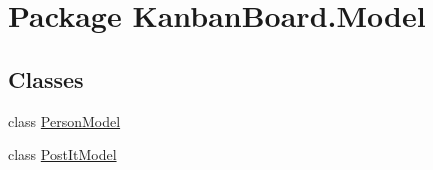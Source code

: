 \hypertarget{namespace_kanban_board_1_1_model}{}\section{Package Kanban\+Board.\+Model}
\label{namespace_kanban_board_1_1_model}
\subsection*{Classes}
\begin{DoxyCompactItemize}
\item 
class \hyperlink{class_kanban_board_1_1_model_1_1_person_model}{Person\+Model}
\item 
class \hyperlink{class_kanban_board_1_1_model_1_1_post_it_model}{Post\+It\+Model}
\end{DoxyCompactItemize}

